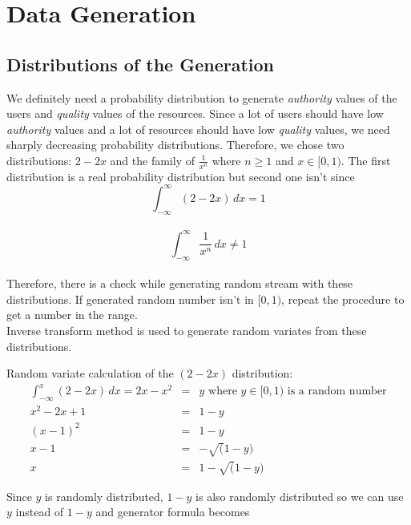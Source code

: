 \documentclass[12pt,a4paper]{report}
\begin{document}
\chapter{Data Generation}

\section{Distributions of the Generation}

	\hspace{0.6cm}We definitely need a probability distribution to generate \emph{authority} values of the users and \emph{quality} values of the resources. Since a lot of users should have low \emph{authority} values and a lot of resources should have low \emph{quality} values, we need sharply decreasing probability distributions. Therefore, we chose two distributions: $2 - 2x$ and the family of $\frac{1}{x^n}$ where $n\ge 1$ and $x \in [0, 1)$. The first distribution is a real probability distribution but second one isn't since \\

	$$\int_{-\infty}^{\infty} \!  (2-2x)\, dx = 1$$ \\

	$$\int_{-\infty}^{\infty} \! \frac{1}{x^n}\, dx \not= 1$$ \\

	Therefore, there is a check while generating random stream with these distributions. If generated random number isn't in $[0, 1)$, repeat the procedure to get a number in the range. \\

	Inverse transform method is used to generate random variates from these distributions.

	\clearpage

	Random variate calculation of the $(2-2x)$ distribution:
	\begin{eqnarray*}
		 \int_{-\infty}^x \!  (2-2x)\, dx  = 2x -  x^2  & = & y \text{ where } y \in [0, 1) \text{ is a random number}\\
		x^2-2x+1 & = & 1 - y \\
		(x-1)^2 & = & 1 - y \\
		x - 1 & = & -\sqrt (1 - y) \\
		x & = & 1 - \sqrt(1-y)
	\end{eqnarray*}

	Since $y$ is randomly distributed, $1-y$ is also randomly distributed so we can use $y$ instead of $1-y$ and generator formula becomes 
\end{document}

